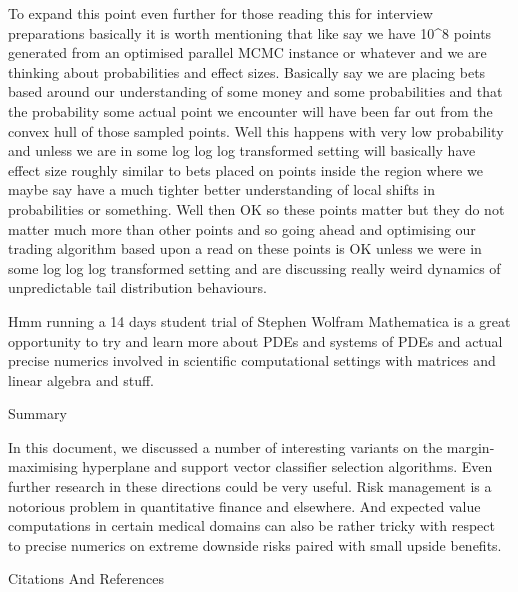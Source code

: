 To expand this point even further for those reading this for interview preparations basically it is worth mentioning that like say we have 10^8 points generated from an optimised parallel MCMC instance or whatever and we are thinking about probabilities and effect sizes. Basically say we are placing bets based around our understanding of some money and some probabilities and that the probability some actual point we encounter will have been far out from the convex hull of those sampled points. Well this happens with very low probability and unless we are in some log log log transformed setting will basically have effect size roughly similar to bets placed on points inside the region where we maybe say have a much tighter better understanding of local shifts in probabilities or something. Well then OK so these points matter but they do not matter much more than other points and so going ahead and optimising our trading algorithm based upon a read on these points is OK unless we were in some log log log transformed setting and are discussing really weird dynamics of unpredictable tail distribution behaviours.

Hmm running a 14 days student trial of Stephen Wolfram Mathematica is a great opportunity to try and learn more about PDEs and systems of PDEs and actual precise numerics involved in scientific computational settings with matrices and linear algebra and stuff.

	Summary

In this document, we discussed a number of interesting variants on the margin-maximising hyperplane and support vector classifier selection algorithms. Even further research in these directions could be very useful. Risk management is a notorious problem in quantitative finance and elsewhere. And expected value computations in certain medical domains can also be rather tricky with respect to precise numerics on extreme downside risks paired with small upside benefits.

	Citations And References

